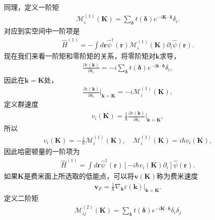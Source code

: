 \documentclass[10pt, oneside]{article}
\begin{document}
同理，定义一阶矩
\begin{align}
	\mathcal{M}^{\left(1\right)}_{i} \left(\bm{K}\right) = \sum_{\bm{\delta}} t \left(\bm{\delta}\right)  e^{-i \bm{K} \cdot \bm{\delta}} \delta_{i}.
\end{align}
对应到实空间中一阶项是
\begin{align}
	\hat{H}^{\left(1\right)} = - \int d \bm{r} \hat{\psi}^{\dagger} \left(\bm{r}\right) \mathcal{M}^{\left(1\right)}_{i} \left(\bm{K}\right) \partial_{i}  \hat{\psi} \left(\bm{r}\right) .
\end{align}
现在我们来看一阶矩和零阶矩的关系，将零阶矩对\(\bm{k}\)求导，
\begin{align}
	\frac{\partial \varepsilon \left(\bm{k}\right)}{\partial k_{i}} = -i \sum_{\bm{\delta}} t \left(\bm{\delta}\right) e^{-i \bm{k} \cdot \bm{\delta}} \delta_{i},
\end{align}
因此在\(\bm{k} = \bm{K}\)处，
\begin{align}
	\frac{\partial \varepsilon \left(\bm{k}\right)}{\partial k_{i}}  \bigg|_{\bm{k} = \bm{K}} = - i \mathcal{M}^{\left(1\right)}_{i} \left(\bm{K}\right),
\end{align}
定义群速度
\begin{align}
	v_i \left(\bm{K}\right) = \frac{1}{\hbar} \frac{\partial \varepsilon \left(\bm{k}\right)}{\partial k_{i}}  \bigg|_{\bm{k} = \bm{K}} ,
\end{align}
所以
\begin{align}
	v_i \left(\bm{K}\right) = - \frac{i}{\hbar} \mathcal{M}^{\left(1\right)}_{i} \left(\bm{K}\right), \quad \mathcal{M}^{\left(1\right)}_{i} \left(\bm{K}\right) = i \hbar v_i \left(\bm{K}\right),
\end{align} 
因此哈密顿量的一阶项为
\begin{align}
	\hat{H}^{\left(1\right)} = \int d \bm{r} \hat{\psi}^{\dagger} \left(\bm{r}\right) \left[- i \hbar v_i \left(\bm{K}\right) \partial_{i} \right]  \hat{\psi} \left(\bm{r}\right) .
\end{align}
如果\(\bm{K}\)是费米面上所选取的低能点，可以将\(\bm{v} \left(\bm{K}\right)\)称为费米速度
\begin{align}
	\bm{v}_F = \frac{1}{\hbar} \nabla_{\bm{k}} \varepsilon \left(\bm{k}\right) \bigg|_{\bm{k} = \bm{K}}.
\end{align}
定义二阶矩
\begin{align}
	\mathcal{M}^{\left(2\right)}_{ij} \left(\bm{K}\right) = \sum_{\bm{\delta}} t \left(\bm{\delta}\right)  e^{-i \bm{K} \cdot \bm{\delta}} \delta_{i} \delta_{j}
\end{align}
\end{document}
